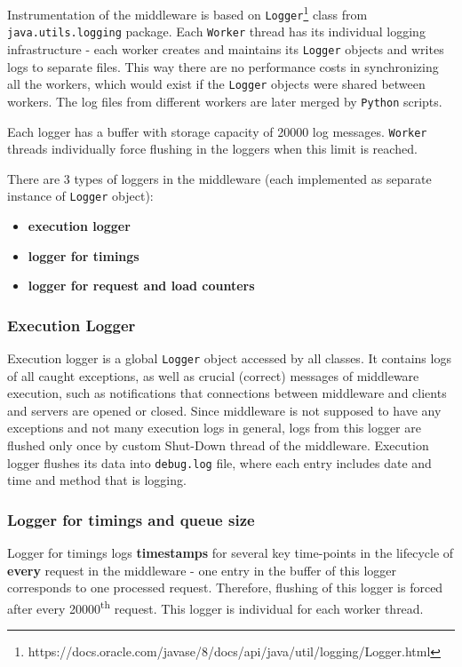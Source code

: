\documentclass[11pt,a4paper]{article}
\begin{document}
Instrumentation of the middleware is based on \texttt{Logger}\footnote{https://docs.oracle.com/javase/8/docs/api/java/util/logging/Logger.html} class from \texttt{java.utils.logging} package. Each \texttt{Worker} thread has its individual logging infrastructure - each worker creates and maintains its \texttt{Logger} objects and writes logs to separate files. This way there are no performance costs in synchronizing all the workers, which would exist if the \texttt{Logger} objects were shared between workers. The log files from different workers are later merged by \texttt{Python} scripts.

Each logger has a buffer with storage capacity of 20000 log messages. \texttt{Worker} threads individually force flushing in the loggers when this limit is reached.

There are 3 types of loggers in the middleware (each implemented as separate instance of \texttt{Logger} object):
\begin{itemize}
	\item \textbf{execution logger} 
	\item \textbf{logger for timings}
	\item \textbf{logger for request and load counters}
\end{itemize}  

\subsubsection{Execution Logger}

Execution logger is a global \texttt{Logger} object accessed by all classes. It contains logs of all caught exceptions, as well as crucial (correct) messages of middleware execution, such as notifications that connections between middleware and clients and servers are opened or closed. Since middleware is not supposed to have any exceptions and not many execution logs in general, logs from this logger are flushed only once by custom Shut-Down thread of the middleware. Execution logger flushes its data into \texttt{debug.log} file, where each entry includes date and time and method that is logging.

\subsubsection{Logger for timings and queue size}

Logger for timings logs \textbf{timestamps} for several key time-points in the lifecycle of \textbf{every} request in the middleware - one entry in the buffer of this logger corresponds to one processed request. Therefore, flushing of this logger is forced after every 20000\textsuperscript{th} request. This logger is individual for each worker thread.
\end{document}
